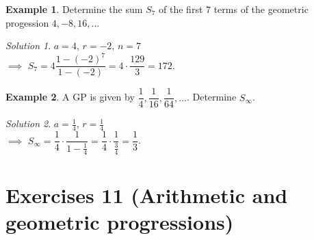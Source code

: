 \documentclass[
  12pt,
  oneside]{book}
\theoremstyle{definition}
\theoremstyle{definition}
\newtheorem{example}{Example}[chapter]
\theoremstyle{definition}
\theoremstyle{definition}
\theoremstyle{remark}
\newtheorem*{solution}{Solution}
\begin{document}
\begin{example}
Determine the sum \(S_7\) of the first \(7\) terms of the geometric progession \(4,-8,16,\dots\)
\end{example}

\begin{solution}
\(a=4\), \(r=-2\), \(n=7\)\\
\(\implies\) \(S_7=4\dfrac{1-(-2)^7}{1-(-2)}=4\cdot\dfrac{129}3 = 172\).
\end{solution}

\begin{example}
A GP is given by \(\dfrac14,\dfrac1{16},\dfrac1{64},\dots\). Determine \(S_\infty\).
\end{example}

\begin{solution}
\(a=\frac14\), \(r=\frac14\)\\
\(\implies\) \(S_\infty = \dfrac{1}{4}\cdot\dfrac{1}{1-\frac14}= \dfrac{1}{4}\cdot\dfrac{1}{\frac{3}{4}}=\dfrac{1}{3}\).
\end{solution}

\chapter*{Exercises 11 (Arithmetic and geometric progressions)}\label{exercises-11-arithmetic-and-geometric-progressions}
\end{document}
